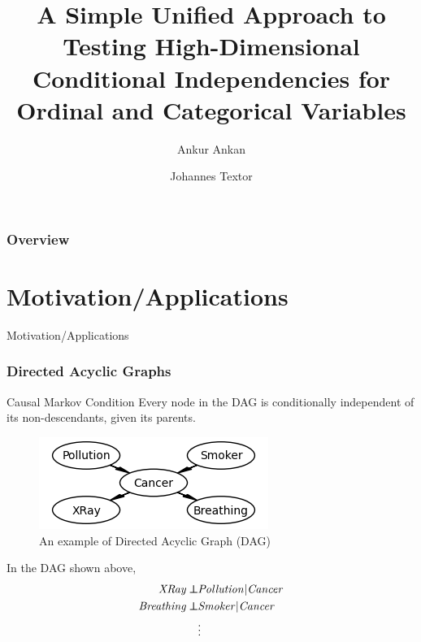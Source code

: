 \documentclass{beamer}
\def\ci{\perp\!\!\!\!\!\perp}
\begin{document}
\title[Unified CI test for Ordinal and Categorical Variables]{A Simple Unified Approach to Testing High-Dimensional Conditional Independencies for Ordinal and Categorical Variables}
\author {Ankur Ankan \and Johannes Textor}
\date{}
\maketitle

\begin{frame}
	\frametitle{Overview}
	\tableofcontents
\end{frame}

\section{Motivation/Applications}
\begin{frame}
	\begin{center} \Huge{Motivation/Applications} \end{center}
\end{frame}
\begin{frame}
	\frametitle{Directed Acyclic Graphs}
	\begin{block}{Causal Markov Condition}
		Every node in the DAG is conditionally independent of its non-descendants, given its parents.
	\end{block}
	\begin{figure}
		\centering
		\includegraphics[scale=0.6]{imgs/example_dag.png}
		\caption*{An example of Directed Acyclic Graph (DAG) \footnotemark}
	\end{figure}
	In the DAG shown above,
	\begin{equation*}
		\begin{split}
			\text{\emph{XRay}} \ci & \text{\emph{Pollution}} | \text{\emph{Cancer}} \\
			\text{\emph{Breathing}} \ci & \text{\emph{Smoker}} | \text{\emph{Cancer}} \\
			& \vdots \\
		\end{split}
	\end{equation*}
\end{frame}
\end{document}
